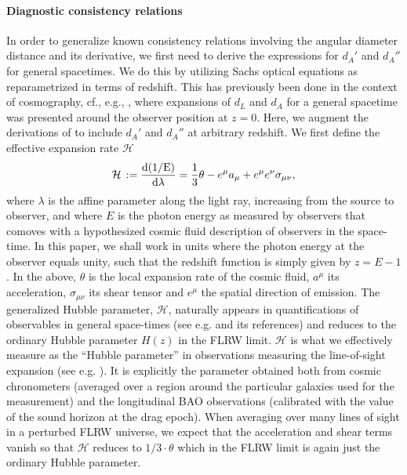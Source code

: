 \documentclass[reprint,aps,prd,nofootinbib,a4paper,10pt,twocolumn,superscriptaddress]{revtex4-2}
\begin{document}
\paragraph*{Diagnostic consistency relations}
In order to generalize known consistency relations involving the angular diameter distance and its derivative, we first need to derive the expressions for $d_A'$ and $d_A''$ for general spacetimes. We do this by utilizing Sachs optical equations as reparametrized in terms of redshift.
This has previously been done in the context of cosmography, cf., e.g., \cite{asta}, where expansions of $d_L$ and $d_A$ for a general spacetime was presented around the observer position at $z = 0$. Here, we augment the derivations of \cite{asta} to include $d_A'$ and $d_A''$ at arbitrary redshift.
We first define the effective expansion rate $\mathcal{H}$
\begin{align}
    \mathcal{H} \, :=  \frac{\rm d (1/E)  }{{\rm d} \lambda  } = \frac{1}{3}\theta - e^\mu a_\mu + e^\mu e^\nu\sigma_{\mu\nu},
\end{align}
where $\lambda$ is the affine parameter along the light ray, increasing from the source to observer, and where $E$ is the photon energy as measured by observers that comoves with a hypothesized cosmic fluid description of observers in the space-time. In this paper, we shall work in units where the photon energy at the observer equals unity, such that the redshift function is simply given by $z = E - 1$.
In the above, $\theta$ is the local expansion rate of the cosmic fluid, $a^\mu$ its acceleration, $\sigma_{\mu\nu}$ its shear tensor and $e^\mu$ the spatial direction of emission. The generalized Hubble parameter, $\mathcal{H}$, naturally appears in quantifications of observables in general space-times (see e.g. \cite{Clarkson:2010uz} and its references) and reduces to the ordinary Hubble parameter $H(z)$ in the FLRW limit. $\mathcal{H}$ is what we effectively measure as the ``Hubble parameter'' in observations measuring the line-of-sight expansion (see e.g. \cite{asta}). It is explicitly the parameter obtained both from cosmic chronometers \cite{Heinesen:2024gdi} (averaged over a region around the particular galaxies used for the measurement) and the longitudinal BAO observations \cite{astabao1, astaboa2} (calibrated with the value of the sound horizon at the drag epoch). When averaging over many lines of sight in a perturbed FLRW universe, we expect that the acceleration and shear terms vanish so that $\mathcal{H}$ reduces to $1/3\cdot \theta$ which in the FLRW limit is again just the ordinary Hubble parameter.
\end{document}
